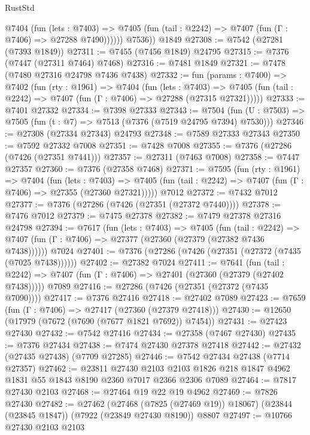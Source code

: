 \begin{lexlean}{RustStd}
\begin{coremodule}
            @7404
              (fun (lets : @7403) =>
              @7405 (fun (tail : @2242) => @7407 (fun (Γ : @7406) => @27288 @7490))))))
        @7536))
    @1849
@27308 := @7542 (@27281 (@7393 @1849))
@27311 := @7455 (@7456 @1849) @24795
@27315 := @7376 (@7447 (@27311 @7464) @7468)
@27316 := @7481 @1849
@27321 := @7478 (@7480 @27316 @24798 @7436 @7438)
@27332 := fun (params : @7400) =>
  @7402
    (fun (rty : @1961) =>
    @7404
      (fun (lets : @7403) =>
      @7405 (fun (tail : @2242) => @7407 (fun (Γ : @7406) => @27288 (@27315 @27321)))))
@27333 := @7401 @27332
@27334 := @7398 @27333
@27343 := @7504
    (fun (U : @7503) => @7505 (fun (t : @7) => @7513 (@7376 (@7519 @24795 @7394) @7530)))
@27346 := @27308 (@27334 @27343) @24793
@27348 := @7589 @27333 @27343
@27350 := @7592 @27332 @7008
@27351 := @7428 @7008
@27355 := @7376 (@27286 (@7426 (@27351 @7441)))
@27357 := @27311 (@7463 @7008)
@27358 := @7447 @27357
@27360 := @7376 (@27358 @7468)
@27371 := @7595
    (fun (rty : @1961) =>
    @7404
      (fun (lets : @7403) =>
      @7405 (fun (tail : @2242) => @7407 (fun (Γ : @7406) => @27355 (@27360 @27321)))))
    @7012
@27372 := @7432 @7012
@27377 := @7376 (@27286 (@7426 (@27351 (@27372 @7440))))
@27378 := @7476 @7012
@27379 := @7475 @27378
@27382 := @7479 @27378 @27316 @24798
@27394 := @7617
    (fun (lets : @7403) =>
    @7405
      (fun (tail : @2242) =>
      @7407 (fun (Γ : @7406) => @27377 (@27360 (@27379 (@27382 @7436 @7438))))))
    @7024
@27401 := @7376 (@27286 (@7426 (@27351 (@27372 (@7435 (@7025 @7438))))))
@27402 := @27382 @7024
@27411 := @7641
    (fun (tail : @2242) => @7407 (fun (Γ : @7406) => @27401 (@27360 (@27379 (@27402 @7438)))))
    @7089
@27416 := @27286 (@7426 (@27351 (@27372 (@7435 @7090))))
@27417 := @7376 @27416
@27418 := @27402 @7089
@27423 := @7659 (fun (Γ : @7406) => @27417 (@27360 (@27379 @27418)))
@27430 := @12650 (@17979 (@7672 (@7690 (@7677 @1821 @7692)) @7454))
@27431 := @27423 @27430
@27432 := @7542 @27416
@27434 := @27358 (@7467 @27430)
@27435 := @7376 @27434
@27438 := @7474 @27430 @27378 @27418
@27442 := @27432 (@27435 @27438) (@7709 @27285)
@27446 := @7542 @27434 @27438 (@7714 @27357)
@27462 := @23811
    @27430
    @2103
    @2103
    @1826
    @218
    @1847
    @4962
    @1831
    @55
    @1843
    @8190
    @2360
    @7017
    @2366
    @2306
    @7089
@27464 := @7817 @27430 @2103
@27468 := @27464 @19 @22 @19 @4962
@27469 := @7826 @27430
@27482 := @27462
    (@27468 (@7825 (@27469 @19)) @18067)
    (@23844 (@23845 @1847))
    (@7922 (@23849 @27430 @8190))
    @8807
@27497 := @10766
    @27430
    @2103
    @2103

\end{coremodule}
\end{lexlean}
